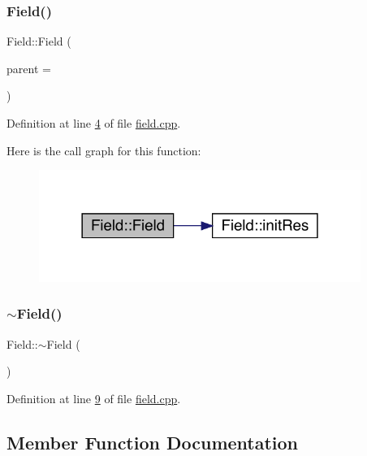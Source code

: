 \subsubsection{\texorpdfstring{Field()}{Field()}}
{\footnotesize\ttfamily Field\+::\+Field (\begin{DoxyParamCaption}\item[{Q\+Widget $\ast$}]{parent = {} }\end{DoxyParamCaption})}



Definition at line \hyperlink{a00071_source_l00004}{4} of file \hyperlink{a00071_source}{field.\+cpp}.

Here is the call graph for this function\+:
\nopagebreak
\begin{figure}[H]
\begin{center}
\leavevmode
\includegraphics[width=297pt]{d7/d3f/a00173_ab3e028578ffc9df6d7d12dbbc83be19f_cgraph}
\end{center}
\end{figure}
\mbox{\label{a00173_a45d6e6d09b8f8e46de62b40119d62c60}} 
\subsubsection{\texorpdfstring{$\sim$\+Field()}{~Field()}}
{\footnotesize\ttfamily Field\+::$\sim$\+Field (\begin{DoxyParamCaption}{ }\end{DoxyParamCaption})}



Definition at line \hyperlink{a00071_source_l00009}{9} of file \hyperlink{a00071_source}{field.\+cpp}.



\subsection{Member Function Documentation}
\mbox{\label{a00173_a05becf8069f37b0529b691fcdd1ca8f1}} 
